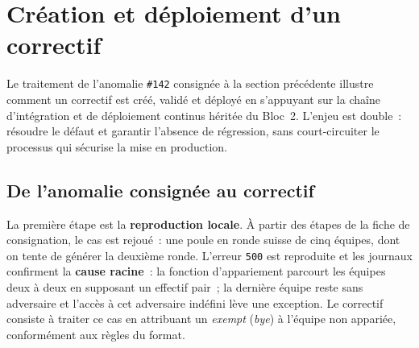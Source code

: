 \section{Création et déploiement d'un correctif}
\label{sec:correctif}

Le traitement de l'anomalie \texttt{\#142} consignée à la section précédente illustre comment un correctif est créé, validé et déployé en s'appuyant sur la chaîne d'intégration et de déploiement continus héritée du Bloc~2. L'enjeu est double~: résoudre le défaut et garantir l'absence de régression, sans court-circuiter le processus qui sécurise la mise en production.

\subsection{De l'anomalie consignée au correctif}
La première étape est la \textbf{reproduction locale}. À partir des étapes de la fiche de consignation, le cas est rejoué~: une poule en ronde suisse de cinq équipes, dont on tente de générer la deuxième ronde. L'erreur \texttt{500} est reproduite et les journaux confirment la \textbf{cause racine}~: la fonction d'appariement parcourt les équipes deux à deux en supposant un effectif pair~; la dernière équipe reste sans adversaire et l'accès à cet adversaire indéfini lève une exception. Le correctif consiste à traiter ce cas en attribuant un \emph{exempt} (\emph{bye}) à l'équipe non appariée, conformément aux règles du format.

